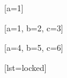 \documentclass{autoexam}
\begin{document}
\begin{problems}

	[a=1]

	[a=1, b=2, c=3]

	[a=4, b=5, c=6]

	[lst=locked]
\end{problems}
\end{document}
